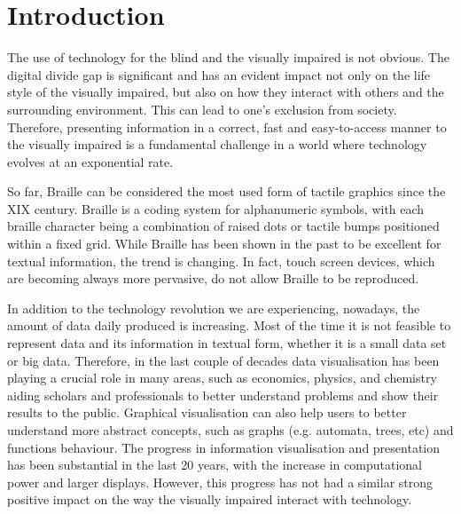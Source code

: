 \chapter{Introduction}
The use of technology for the blind and the visually impaired is not obvious. The digital divide gap is significant and has an evident impact not only on the life style of the visually impaired, but also on how they interact with others and the surrounding environment. This can lead to one's exclusion from society. Therefore, presenting information in a correct, fast and easy-to-access manner to the visually impaired is a fundamental challenge in a world where technology evolves at an exponential rate. \par

So far, Braille can be considered the most used form of tactile graphics since the XIX century\cite{andrea2009history}. Braille is a coding system for alphanumeric symbols, with each braille character being a combination of raised dots or tactile bumps positioned within a fixed grid. While Braille has been shown in the past to be excellent for textual information, the trend is changing. In fact, touch screen devices, which are becoming always more pervasive, do not allow Braille to be reproduced. \par

In addition to the technology revolution we are experiencing, nowadays, the amount of data  daily produced is increasing. Most of the time it is not feasible to represent data and its information in textual form, whether it is a small data set or big data. Therefore, in the last couple of decades data visualisation has been playing a crucial role in many areas, such as economics, physics, and chemistry aiding scholars and professionals to better understand problems and show their results to the public. Graphical visualisation can also help users to better understand more abstract concepts, such as graphs (e.g. automata, trees, etc) and functions behaviour. 
The progress in information visualisation and presentation has been substantial in the last 20 years, with the increase in computational power and larger displays. However, this progress has not had a similar strong positive impact on the way the visually impaired interact with technology. \par 

